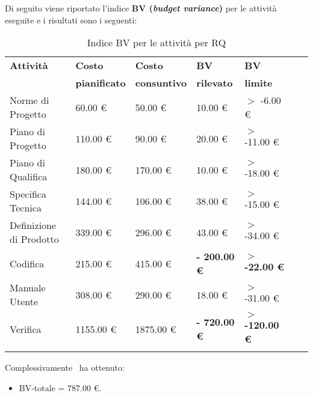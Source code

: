 Di seguito viene riportato l'indice \textbf{BV (\textit{budget variance})} per le attività eseguite e i risultati sono i seguenti:
\begin{longtable}{lllllXr}
\toprule
\textbf{Attività} & \textbf{Costo} & \textbf{Costo} & \textbf{BV} & \textbf{BV} \\
& \textbf{pianificato} & \textbf{consuntivo} & \textbf{rilevato} & \textbf{limite}\\
\toprule
Norme di Progetto & 60.00 € & 50.00 € & 10.00 € & $>$ -6.00 €\\
\midrule
Piano di Progetto & 110.00 € & 90.00 € & 20.00 € & $>$ -11.00 €\\
\midrule
Piano di Qualifica & 180.00 € & 170.00 € & 10.00 € & $>$ -18.00 €\\
\midrule
Specifica Tecnica & 144.00 € & 106.00 € & 38.00 € & $>$ -15.00 €\\
\midrule
Definizione di Prodotto & 339.00 € & 296.00 € & 43.00 € & $>$ -34.00 €\\
\midrule
Codifica & 215.00 € & 415.00 € & \textbf{- 200.00 €} & \textbf{$>$ -22.00 €}\\
\midrule
Manuale Utente & 308.00 € & 290.00 € & 18.00 € & $>$ -31.00 €\\
\midrule
	Verifica & 1155.00 € & 1875.00 € & \textbf{- 720.00 €} & \textbf{$>$ -120.00 €}\\
\bottomrule
\caption{Indice BV per le attività per RQ}
\end{longtable}
Complessivamente \gruppo ~ha ottenuto:
\begin{itemize}
\item BV-totale = 787.00 €.
\end{itemize}
